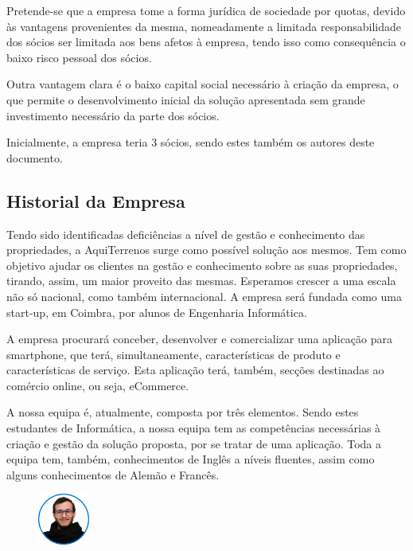\documentclass[11pt]{article}
\begin{document}
	Pretende-se que a empresa tome a forma jurídica de sociedade por quotas, devido às vantagens provenientes da mesma, nomeadamente a limitada responsabilidade dos sócios ser limitada aos bens afetos à empresa, tendo isso como consequência o baixo risco pessoal dos sócios.
	
	Outra vantagem clara é o baixo capital social necessário à criação da empresa, o que permite o desenvolvimento inicial da solução apresentada sem grande investimento necessário da parte dos sócios.
	
	Inicialmente, a empresa teria 3 sócios, sendo estes também os autores deste documento.
	
	\pagebreak
	
	\large
	\subsection{Historial da Empresa}
	
	\normalsize
	
	Tendo sido identificadas deficiências a nível de gestão e conhecimento das propriedades, a AquiTerrenos surge como possível solução aos mesmos. Tem como objetivo ajudar os clientes na gestão e conhecimento sobre as suas propriedades, tirando, assim, um maior proveito das mesmas. Esperamos crescer a uma escala não só nacional, como também internacional. A empresa será fundada como uma start-up, em Coimbra, por alunos de Engenharia Informática.
	
	A empresa procurará conceber, desenvolver e comercializar uma aplicação para smartphone, que terá, simultaneamente, características de produto e características de serviço. Esta aplicação terá, também, secções destinadas ao comércio online, ou seja, eCommerce.
	
	A nossa equipa é, atualmente, composta por três elementos. Sendo estes estudantes de Informática, a nossa equipa tem as competências necessárias à criação e gestão da solução proposta, por se tratar de uma aplicação. Toda a equipa tem, também, conhecimentos de Inglês a níveis fluentes, assim como alguns conhecimentos de Alemão e Francês.
	
	\vspace{1cm}
	
	\begin{figure}[h]
		\includegraphics[width=0.15\textwidth,keepaspectratio]{jalmeida}
		\label{fig:ja}
		\centering
	\end{figure}
	
\end{document}

